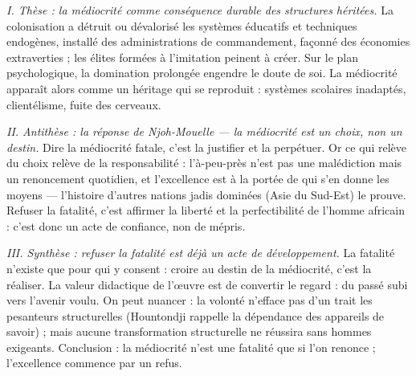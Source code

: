 \documentclass[11pt]{article}
\begin{document}
\begin{corrige}
\emph{I. Thèse : la médiocrité comme conséquence durable des structures héritées.} La colonisation a détruit ou dévalorisé les systèmes éducatifs et techniques endogènes, installé des administrations de commandement, façonné des économies extraverties ; les élites formées à l'imitation peinent à créer. Sur le plan psychologique, la domination prolongée engendre le doute de soi. La médiocrité apparaît alors comme un héritage qui se reproduit : systèmes scolaires inadaptés, clientélisme, fuite des cerveaux.

\emph{II. Antithèse : la réponse de Njoh-Mouelle — la médiocrité est un choix, non un destin.} Dire la médiocrité fatale, c'est la justifier et la perpétuer. Or ce qui relève du choix relève de la responsabilité : l'à-peu-près n'est pas une malédiction mais un renoncement quotidien, et l'excellence est à la portée de qui s'en donne les moyens — l'histoire d'autres nations jadis dominées (Asie du Sud-Est) le prouve. Refuser la fatalité, c'est affirmer la liberté et la perfectibilité de l'homme africain : c'est donc un acte de confiance, non de mépris.

\emph{III. Synthèse : refuser la fatalité est déjà un acte de développement.} La fatalité n'existe que pour qui y consent : croire au destin de la médiocrité, c'est la réaliser. La valeur didactique de l'œuvre est de convertir le regard : du passé subi vers l'avenir voulu. On peut nuancer : la volonté n'efface pas d'un trait les pesanteurs structurelles (Hountondji rappelle la dépendance des appareils de savoir) ; mais aucune transformation structurelle ne réussira sans hommes exigeants. Conclusion : la médiocrité n'est une fatalité que si l'on renonce ; l'excellence commence par un refus.
\end{corrige}
\end{document}
